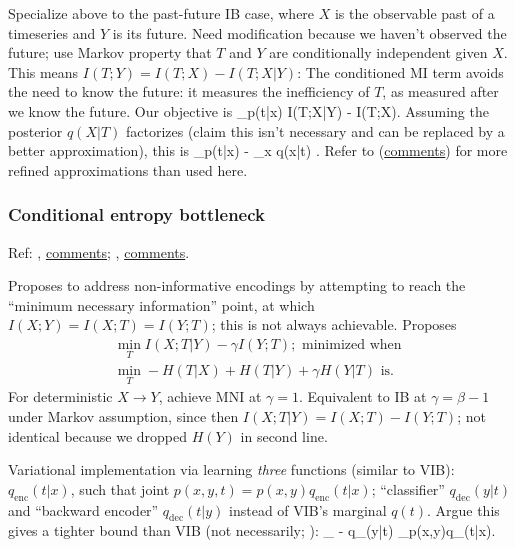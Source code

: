 \documentclass[notitlepage,openany,11pt]{report}
\theoremstyle{plain}%
\numberwithin{equation}{section}
\begin{document}
Specialize above to the past-future IB case, where $X$ is the observable past of a timeseries and $Y$ is its future. Need modification because we haven't observed the future; use Markov property that $T$ and $Y$ are conditionally independent given $X$. This means $I(T;Y) = I(T;X) - I(T; X|Y)$: The conditioned MI term avoids the need to know the future: it measures the inefficiency of $T$, as measured after we know the future. Our objective is
\be
\min_{p(t|x)} I(T;X|Y) - \beta I(T;X).
\ee
Assuming the posterior $q(X|T)$ factorizes (claim this isn't necessary and can be replaced by a better approximation), this is
\be
\min_{p(t|x)} \left\langle \log{} - \beta \sum_{x} \log q(x|t) \right\rangle.
\ee
Refer to \cite{AlemiFischer:18a} (\href{https://openreview.net/forum?id=HJeQToAqKQ}{comments}) for more refined approximations than used here.


\subsubsection{Conditional entropy bottleneck}
Ref: \cite{Fischer:20}, \href{https://openreview.net/forum?id=rkVOXhAqY7}{comments}; \cite{FischerAlemi:20}, \href{https://openreview.net/forum?id=SygEukHYvB}{comments}. 

Proposes to address non-informative encodings by attempting to reach the ``minimum necessary information'' point, at which $I(X;Y) = I(X;T) = I(Y;T)$; this is not always achievable. Proposes 
\begin{align*}
\min_{T} I(X; T|Y) - \gamma I(Y;T); \text{ minimized when } \\
\min_{T} -H(T|X) + H(T|Y) + \gamma H(Y|T) \text{ is.}
\end{align*}
For deterministic $X \rightarrow Y$, achieve MNI at $\gamma = 1$. Equivalent to IB at $\gamma = \beta - 1$ under Markov assumption, since then $I(X; T|Y) = I(X;T) - I(Y;T)$; not identical because we dropped $H(Y)$ in second line.

Variational implementation via learning \emph{three} functions (similar to VIB): $q_{\text{enc}}(t|x)$, such that joint $p(x,y,t) = p(x,y)q_{\text{enc}}(t|x)$; ``classifier'' $q_{\text{dec}}(y|t)$ and ``backward encoder'' $q_{\text{dec}}(t|y)$ instead of VIB's marginal $q(t)$.  Argue this gives a tighter bound than VIB (not necessarily; \cite{GeigerFischer:20}):
\be
\min_{} \left\langle \log {} - \gamma \log q_{}(y|t) \right\rangle_{p(x,y)q_{}(t|x)}.
\ee
\end{document}
